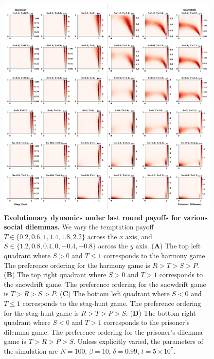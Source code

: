 \documentclass[11pt]{article}
\theoremstyle{plainCl1}
\theoremstyle{plainCl2}
\begin{document}
\begin{figure}[!htbp]
  \centering
  \includegraphics[width=\textwidth]{static/stochastic_two_by_two_games.pdf}
  \caption{{\bf Evolutionary dynamics under last round payoffs for various social dilemmas.} 
  We vary the temptation payoff \(T \in \{0.2, 0.6, 1, 1.4, 1.8, 2.2\}\) across
  the \(x\) axis, and  \(S \in \{1.2, 0.8, 0.4, 0, -0.4, -0.8\}\) across the
  \(y\) axis. ({\bf A}) The top left quadrant where \(S > 0\) and \(T \leq 1\)
  corresponds to the harmony game. The preference ordering for the harmony game
  is \(R > T > S > P\). ({\bf B}) The top right quadrant where \(S > 0\) and \(T > 1\)
  corresponds to the snowdrift game. The preference ordering for the snowdrift game
  is \(T > R > S > P\). ({\bf C}) The bottom left quadrant where \(S < 0\) and \(T \leq 1\)
  corresponds to the stag-hunt game. The preference ordering for the stag-hunt game
  is \(R > T > P > S\). ({\bf D}) The bottom right quadrant where \(S < 0\) and \(T > 1\)
  corresponds to the prisoner's dilemma game. The preference ordering for the prisoner's dilemma game
  is \(T > R > P > S\).
  Unless explicitly varied, the parameters of the simulation
  are $N\!=\!100$, $\beta\!=\!10$, $\delta\!=\!0.99$, $t\!=\!5\times 10^7$.}
  \label{fig:last_round_two_by_two}
\end{figure}
\end{document}
